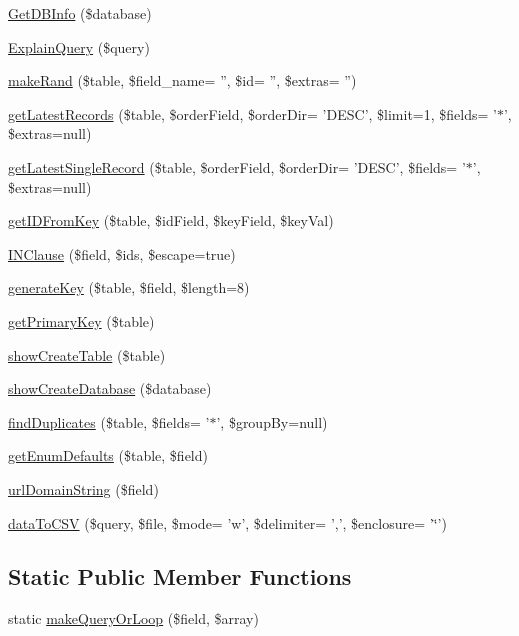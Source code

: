 \begin{DoxyCompactItemize}
\item 
\hyperlink{classdb_p_d_o_a90f6db25df3fb3cfaead3ed37df8961f}{Get\-D\-B\-Info} (\$database)
\item 
\hyperlink{classdb_p_d_o_a7e074c1f9b58dadebbd0886cd5e51958}{Explain\-Query} (\$query)
\item 
\hyperlink{classdb_p_d_o_aa8ca4594bbf9d1d8a10e156add940923}{make\-Rand} (\$table, \$field\-\_\-name= '', \$id= '', \$extras= '')
\item 
\hyperlink{classdb_p_d_o_a96e5f76350e0a97c210fefb54a0a33f8}{get\-Latest\-Records} (\$table, \$order\-Field, \$order\-Dir= 'D\-E\-S\-C', \$limit=1, \$fields= '$\ast$', \$extras=null)
\item 
\hyperlink{classdb_p_d_o_a70ad2609f7efd4a68121f0d94b912402}{get\-Latest\-Single\-Record} (\$table, \$order\-Field, \$order\-Dir= 'D\-E\-S\-C', \$fields= '$\ast$', \$extras=null)
\item 
\hyperlink{classdb_p_d_o_a3d2a1ced1ef3cca4e002782b46ecc8e1}{get\-I\-D\-From\-Key} (\$table, \$id\-Field, \$key\-Field, \$key\-Val)
\item 
\hyperlink{classdb_p_d_o_adc7544a8840d5fd7e539f71fb8d83471}{I\-N\-Clause} (\$field, \$ids, \$escape=true)
\item 
\hyperlink{classdb_p_d_o_a49470b9344158c38642e83ecd35001a2}{generate\-Key} (\$table, \$field, \$length=8)
\item 
\hyperlink{classdb_p_d_o_a9a5b5961eaf94742e4e501d316dbec94}{get\-Primary\-Key} (\$table)
\item 
\hyperlink{classdb_p_d_o_a0e5d18a3b673b71c7021da0290e19c13}{show\-Create\-Table} (\$table)
\item 
\hyperlink{classdb_p_d_o_a2976cf4c2e337ae307e39192d1c123a6}{show\-Create\-Database} (\$database)
\item 
\hyperlink{classdb_p_d_o_a9811ce2a20086457e7d107f0cc7a9099}{find\-Duplicates} (\$table, \$fields= '$\ast$', \$group\-By=null)
\item 
\hyperlink{classdb_p_d_o_ae773562ecea3e4b041abb27f7b904fec}{get\-Enum\-Defaults} (\$table, \$field)
\item 
\hyperlink{classdb_p_d_o_af56bf70da4ade6315951e09ae9c19753}{url\-Domain\-String} (\$field)
\item 
\hyperlink{classdb_p_d_o_a7707469119f1b1246a59bb07d9600f25}{data\-To\-C\-S\-V} (\$query, \$file, \$mode= 'w', \$delimiter= ',', \$enclosure= '\char`\"{}') 
\end{DoxyCompactItemize}
\subsection*{Static Public Member Functions}
\begin{DoxyCompactItemize}
\item 
static \hyperlink{classdb_p_d_o_ad9aef582c0745cb1f7ef67ae6d9e7d1d}{make\-Query\-Or\-Loop} (\$field, \$array)
\end{DoxyCompactItemize}
